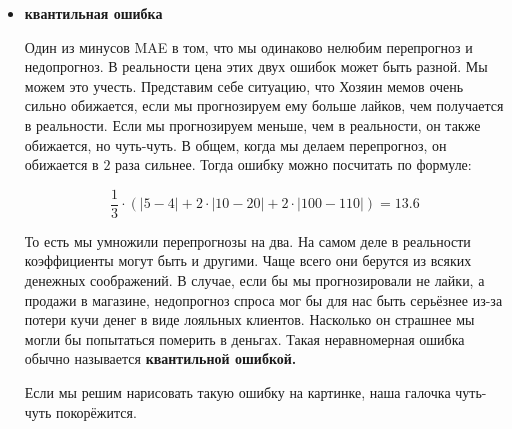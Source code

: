\documentclass[12pt, a4paper, oneside]{article}
\theoremstyle{plain} %
\theoremstyle{definition}
\newcommand{\indef}[1]{\textbf{ \color{green} #1}}
\begin{document}
\begin{solution}
\begin{itemize}
\begin{center}
\end{center}
	 	
\item \indef{квантильная ошибка}

Один из минусов MAE в том, что мы одинаково нелюбим перепрогноз и недопрогноз. В реальности цена этих двух ошибок может быть разной. Мы можем это учесть. Представим себе ситуацию, что Хозяин мемов очень сильно обижается, если мы прогнозируем ему больше лайков, чем получается в реальности. Если мы прогнозируем меньше, чем в реальности, он также обижается, но чуть-чуть. В общем, когда мы делаем перепрогноз, он обижается в $2$ раза сильнее. Тогда ошибку можно посчитать по формуле: 

$$ 
\frac{1}{3} \cdot (|5 - 4| + 2 \cdot |10 - 20| + 2 \cdot |100 - 110|) = 13.6 
$$

То есть мы умножили перепрогнозы на два. На самом деле в реальности коэффициенты могут быть и другими. Чаще всего они берутся из всяких денежных соображений. В случае, если бы мы прогнозировали не лайки, а продажи в магазине, недопрогноз спроса мог бы для нас быть серьёзнее из-за потери кучи денег в виде лояльных клиентов. Насколько он страшнее мы могли бы попытаться померить в деньгах. Такая неравномерная ошибка обычно называется \indef{квантильной ошибкой.}

Если мы решим нарисовать такую ошибку на картинке, наша галочка чуть-чуть покорёжится. 
	
\begin{center}
\end{center}
\end{itemize}
\end{solution}
\end{document}
